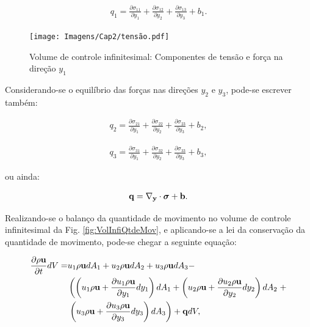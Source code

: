 \documentclass[tese_patricia]{subfiles}%
\begin{document}
\begin{align}
		q_1 =\frac{\partial \sigma_{11}}{\partial y_1} + \frac{\partial \sigma_{12}}{\partial y_2} + \frac{\partial \sigma_{13}}{\partial y_3} + b_{1}.\label{eq:ForçasIntx1} 
\end{align}	

\begin{figure}[htb!]
	\centering 
	\texttt{[image: Imagens/Cap2/tensão.pdf]}	
	\caption{Volume de controle infinitesimal: Componentes de tensão e força na direção $y_1$}
	\label{fig:VolInfiFor}
\end{figure}

Considerando-se o equilíbrio das forças nas direções $y_2$ e $y_3$, pode-se escrever também:

\begin{align}
	q_2 =\frac{\partial \sigma_{21}}{\partial y_1} + \frac{\partial \sigma_{22}}{\partial y_2} + \frac{\partial \sigma_{23}}{\partial y_3} + b_{2}\label{eq:ForçasIntx2},
\end{align}	

\begin{align}
	q_3 =\frac{\partial \sigma_{31}}{\partial y_1} + \frac{\partial \sigma_{32}}{\partial y_2} + \frac{\partial \sigma_{33}}{\partial y_3} + b_{3}\label{eq:ForçasIntx3},
\end{align}

\noindent ou ainda:

\begin{align}
	\mathbf{q} = \mathbf{\nabla_y} \cdot \bm{\sigma} + \mathbf{b}.
\end{align}


Realizando-se o balanço da quantidade de movimento no volume de controle infinitesimal da Fig. \ref{fig:VolInfiQtdeMov}, e aplicando-se a lei da conservação da quantidade de movimento, pode-se chegar a seguinte equação:


\begin{align}
	\begin{split}
	\frac{\partial \rho \mathbf{u}}{\partial t}dV =& u_1\rho \mathbf{u} dA_1 + u_2\rho \mathbf{u} dA_2 + u_3 \rho \mathbf{u} dA_3 - \\
	 & \left(\left(u_1 \rho \mathbf{u} + \frac{\partial u_1 \rho \mathbf{u}}{\partial y_1}dy_1 \right)dA_1 + \left(u_2 \rho \mathbf{u} + \frac{\partial u_2 \rho \mathbf{u}}{\partial y_2}dy_2 \right)dA_2 \right. + \\ & \left.   \left(u_3 \rho \mathbf{u} + \frac{\partial u_3 \rho \mathbf{u}}{\partial y_3}dy_3 \right)dA_3\right) + \mathbf{q} dV,
	\label{eq:QtdeMov0} 
	\end{split}
\end{align}	
\end{document}
